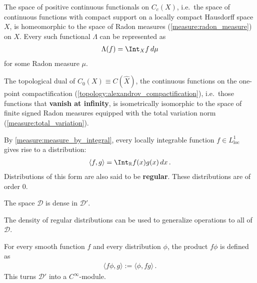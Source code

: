     \begin{theorem}\label{distributions:riesz_markov}
        The space of positive continuous functionals on $C_c(X)$, i.e.~the space of continuous functions with compact support on a locally compact Hausdorff space $X$, is homeomorphic to the space of Radon measures (\cref{measure:radon_measure}) on $X$. Every such functional $\Lambda$ can be represented as
        \begin{gather}
            \Lambda(f) = \Int_Xf\,d\mu
        \end{gather}
        for some Radon measure $\mu$.

        The topological dual of $C_0(X)\equiv C(\widehat{X})$, the continuous functions on the one-point compactification (\cref{topology:alexandrov_compactification}), i.e.~those functions that \textbf{vanish at infinity}, is isometrically isomorphic to the space of finite signed Radon measures equipped with the total variation norm (\cref{measure:total_variation}).
    \end{theorem}

    \begin{example}\label{distributions:ordinary_function}
       	By \cref{measure:measure_by_integral}, every locally integrable function $f\in L^1_{\text{loc}}$ gives rise to a distribution:
       	\begin{gather}
   	    	\langle f,g \rangle = \Int_{\mathbb{R}}f(x)g(x)\,dx\,.
       	\end{gather}
       Distributions of this form are also said to be \textbf{regular}. These distributions are of order 0.
   	\end{example}

    \begin{property}
        The space $\mathcal{D}$ is dense in $\mathcal{D}'$.
    \end{property}

    The density of regular distributions can be used to generalize operations to all of $\mathcal{D}$.
    \begin{property}
        For every smooth function $f$ and every distribution $\phi$, the product $f\phi$ is defined as
        \begin{gather}
            \langle f\phi,g \rangle := \langle\phi,fg\rangle\,.
        \end{gather}
        This turns $\mathcal{D}'$ into a $C^\infty$-module.
    \end{property}

